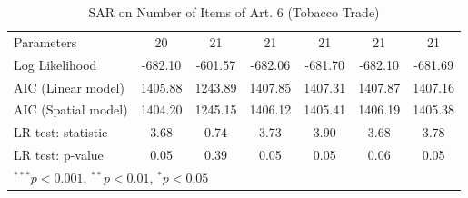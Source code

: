 \begin{table}[!h]
\begin{center}
\begin{tabular}{l c c c c c c }
Parameters              & 20           & 21           & 21           & 21           & 21           & 21           \\
Log Likelihood          & -682.10      & -601.57      & -682.06      & -681.70      & -682.10      & -681.69      \\
AIC (Linear model)      & 1405.88      & 1243.89      & 1407.85      & 1407.31      & 1407.87      & 1407.16      \\
AIC (Spatial model)     & 1404.20      & 1245.15      & 1406.12      & 1405.41      & 1406.19      & 1405.38      \\
LR test: statistic      & 3.68         & 0.74         & 3.73         & 3.90         & 3.68         & 3.78         \\
LR test: p-value        & 0.05         & 0.39         & 0.05         & 0.05         & 0.06         & 0.05         \\
\bottomrule
\multicolumn{7}{l}{\scriptsize{$^{***}p<0.001$, $^{**}p<0.01$, $^*p<0.05$}}
\end{tabular}
\caption{SAR on Number of Items of Art. 6 (Tobacco Trade)}
\label{table:coefficients}
\end{center}
\end{table}

